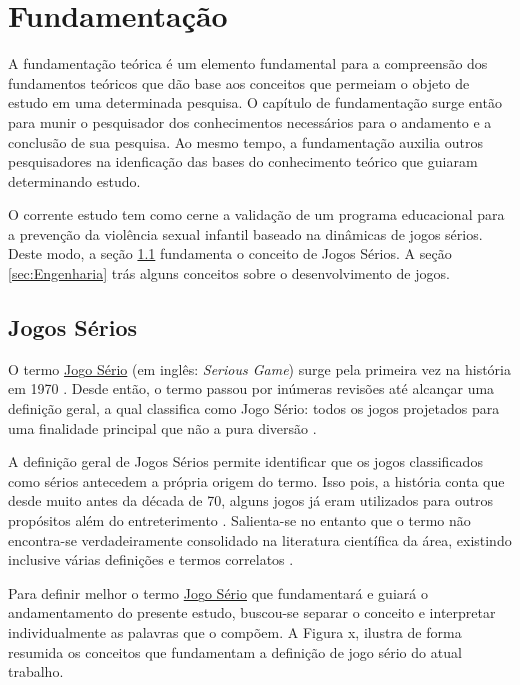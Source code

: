\chapter{Fundamentação}\label{ch:Fundamentacao}

A fundamentação teórica é um elemento fundamental para a compreensão dos fundamentos teóricos que dão base aos conceitos que permeiam o objeto de estudo em uma determinada pesquisa. O capítulo de fundamentação surge então para munir o pesquisador dos conhecimentos necessários para o andamento e a conclusão de sua pesquisa. Ao mesmo tempo, a fundamentação auxilia outros pesquisadores na idenficação das bases do conhecimento teórico que guiaram determinando estudo. 

O corrente estudo tem como cerne a validação de um programa educacional para a prevenção da violência sexual infantil baseado na dinâmicas de jogos sérios. Deste modo, a seção \ref{sec:JogosSerios} fundamenta o conceito de Jogos Sérios. A seção \ref{sec:Engenharia} trás alguns conceitos sobre o desenvolvimento de jogos. %

\section{Jogos Sérios}\label{sec:JogosSerios}

O termo \underline{Jo}g\underline{o Sério} (em inglês: \textit{Serious Game}) surge pela primeira vez na história em 1970 \cite{clark1970serious}. Desde então, o termo passou por inúmeras revisões até alcançar uma definição geral, a qual classifica como Jogo Sério: todos os jogos projetados para uma finalidade principal que não a pura diversão \cite{michael2005serious, de2015aprendizagem, laamarti2014overview}.

A definição geral de Jogos Sérios permite identificar que os jogos classificados como sérios antecedem a própria origem do termo. Isso pois, a história conta que desde muito antes da década de 70, alguns jogos já eram utilizados para outros propósitos além do entreterimento \cite{wilkinson2016brief}. Salienta-se no entanto que o termo não encontra-se verdadeiramente consolidado na literatura científica da área, existindo inclusive várias definições e termos correlatos \cite{pourabdollahian2012serious}.

Para definir melhor o termo \underline{Jo}g\underline{o Sério} que fundamentará e guiará o andamentamento do presente estudo, buscou-se separar o conceito e interpretar individualmente as palavras que o compõem. A Figura x, ilustra de forma resumida os conceitos que fundamentam a definição de jogo sério do atual trabalho.  

